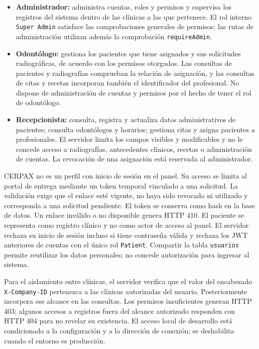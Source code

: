 \begin{itemize}
  \item \textbf{Administrador:} administra cuentas, roles y permisos y
  supervisa los registros del sistema dentro de las clínicas a las que
  pertenece. El rol interno \texttt{Super Admin} satisface las comprobaciones
  generales de permisos; las rutas de administración utilizan además la
  comprobación \texttt{requireAdmin}.

  \item \textbf{Odontólogo:} gestiona los pacientes que tiene asignados
  y sus solicitudes radiográficas, de acuerdo con los permisos otorgados.
  Las consultas de pacientes y radiografías comprueban la relación de
  asignación, y las consultas de citas y recetas incorporan también el
  identificador del profesional. No dispone de administración de cuentas
  y permisos por el hecho de tener el rol de odontólogo.

  \item \textbf{Recepcionista:} consulta, registra y actualiza datos
  administrativos de pacientes; consulta odontólogos y horarios; gestiona
  citas y asigna pacientes a profesionales. El servidor limita los campos
  visibles y modificables y no le concede acceso a radiografías,
  antecedentes clínicos, recetas o administración de cuentas. La
  revocación de una asignación está reservada al administrador.
\end{itemize}

CERPAX no es un perfil con inicio de sesión en el panel. Su acceso se limita
al portal de entrega mediante un token temporal vinculado a una solicitud.
La validación exige que el enlace esté vigente, no haya sido revocado ni
utilizado y corresponda a una solicitud pendiente. El token se conserva
como hash en la base de datos. Un enlace inválido o no disponible genera
HTTP 410. El paciente se representa como registro clínico y no como actor
de acceso al panel. El servidor rechaza su inicio de sesión incluso si tiene
contraseña válida y rechaza los JWT anteriores de cuentas con el único rol
\texttt{Patient}. Compartir la tabla \texttt{usuarios} permite reutilizar los
datos personales; no concede autorización para ingresar al sistema.

Para el aislamiento entre clínicas, el servidor verifica que el valor del
encabezado \texttt{X-Company-ID} pertenezca a las clínicas autorizadas del
usuario. Posteriormente incorpora ese alcance en las consultas. Los
permisos insuficientes generan HTTP 403; algunos accesos a registros fuera
del alcance autorizado responden con HTTP 404 para no revelar su existencia.
El acceso local de desarrollo está condicionado a la configuración y a
la dirección de conexión; se deshabilita cuando el entorno es producción.


